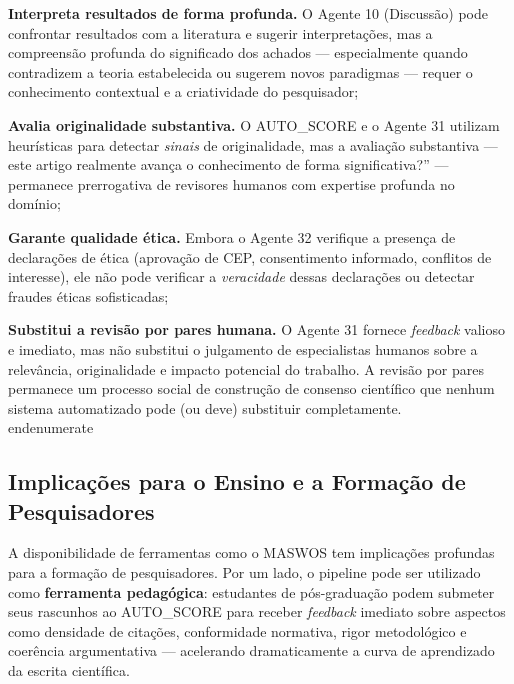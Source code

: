     \item \textbf{Interpreta resultados de forma profunda.}
    O Agente 10 (Discussão) pode confrontar resultados com a
    literatura e sugerir interpretações, mas a compreensão
    profunda do significado dos achados — especialmente quando
    contradizem a teoria estabelecida ou sugerem novos
    paradigmas — requer o conhecimento contextual e a
    criatividade do pesquisador;

    \item \textbf{Avalia originalidade substantiva.} O
    AUTO\_SCORE e o Agente 31 utilizam heurísticas para
    detectar \textit{sinais} de originalidade, mas a
    avaliação substantiva — este artigo realmente avança o
    conhecimento de forma significativa?'' — permanece
    prerrogativa de revisores humanos com expertise profunda
    no domínio;

    \item \textbf{Garante qualidade ética.} Embora o
    Agente 32 verifique a presença de declarações de ética
    (aprovação de CEP, consentimento informado, conflitos de
    interesse), ele não pode verificar a \textit{veracidade}
    dessas declarações ou detectar fraudes éticas sofisticadas;

    \item \textbf{Substitui a revisão por pares humana.}
    O Agente 31 fornece \textit{feedback} valioso e
    imediato, mas não substitui o julgamento de especialistas
    humanos sobre a relevância, originalidade e impacto
    potencial do trabalho. A revisão por pares permanece um
    processo social de construção de consenso científico que
    nenhum sistema automatizado pode (ou deve) substituir
    completamente.
\\end{enumerate}

\subsection{Implicações para o Ensino e a Formação de Pesquisadores}
\label{sec:implicacoes_ensino}

A disponibilidade de ferramentas como o MASWOS tem implicações
profundas para a formação de pesquisadores. Por um lado, o
pipeline pode ser utilizado como \textbf{ferramenta
pedagógica}: estudantes de pós-graduação podem submeter seus
rascunhos ao AUTO\_SCORE para receber \textit{feedback}
imediato sobre aspectos como densidade de citações, conformidade
normativa, rigor metodológico e coerência argumentativa —
acelerando dramaticamente a curva de aprendizado da escrita
científica.


